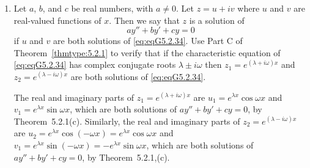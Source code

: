 \documentclass{ximera}
\begin{document}
\begin{problem}
\begin{enumerate}
\item %
Let $a$, $b$, and $c$ be real numbers, with $a\ne0$. Let $z=u+iv$
where $u$ and $v$ are real-valued functions of $x$. Then we say that
$z$ is a solution of \begin{equation}\label{eq:eqG5.2.34}
ay''+by'+cy=0
\end{equation}
if $u$ and $v$ are both solutions of \ref{eq:eqG5.2.34}.
Use Part C of  Theorem~\ref{thmtype:5.2.1} to verify that if the
characteristic equation of \ref{eq:eqG5.2.34} has complex conjugate roots
$\lambda\pm i\omega$ then
$z_1=e^{(\lambda+i\omega)x}$ and $z_2=e^{(\lambda-i\omega)x}$
are both solutions of \ref{eq:eqG5.2.34}.
\begin{solution}
The real and imaginary parts of $z_1=e^{(\lambda+i\omega)x}$ are
$u_1=e^{\lambda x}\cos\omega x$ and $v_1=e^{\lambda x}\sin\omega x$,
which are both solutions of $ay''+by'+cy=0$, by
Theorem~5.2.1(c). Similarly, the real and imaginary parts of
$z_2=e^{(\lambda-i\omega)x}$ are $u_2=e^{\lambda x}\cos(-\omega
x)=e^{\lambda x}\cos\omega x$ and $v_1=e^{\lambda x}\sin(-\omega
x)=-e^{\lambda x}\sin\omega x$, which are both solutions of
$ay''+by'+cy=0$, by Theorem~5.2.1,(c).
\end{solution}
\end{enumerate}


\end{problem}
\end{document}
